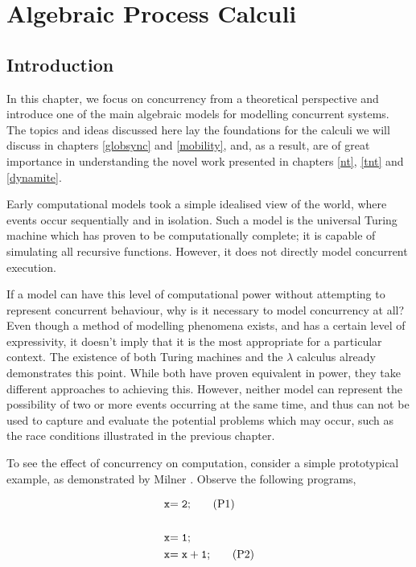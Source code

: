
\chapter{Algebraic Process Calculi}
\label{apc}

\section{Introduction}

In this chapter, we focus on concurrency from a theoretical
perspective and introduce one of the main algebraic models for
modelling concurrent systems.  The topics and ideas discussed here lay
the foundations for the calculi we will discuss in chapters
\ref{globsync} and \ref{mobility}, and, as a result, are of great
importance in understanding the novel work presented in chapters
\ref{nt}, \ref{tnt} and \ref{dynamite}.

Early computational models took a simple idealised view of the world,
where events occur sequentially and in isolation.  Such a model is the
universal Turing machine \cite{turing:36} which has proven to be
computationally complete; it is capable of simulating all recursive
functions.  However, it does not directly model concurrent execution.

If a model can have this level of computational power without
attempting to represent concurrent behaviour, why is it necessary to
model concurrency at all?  Even though a method of modelling phenomena
exists, and has a certain level of expressivity, it doesn't imply that
it is the most appropriate for a particular context.  The existence of
both Turing machines and the $\lambda$ calculus already demonstrates
this point.  While both have proven equivalent in power, they take
different approaches to achieving this.  However, neither model can
represent the possibility of two or more events occurring at the same
time, and thus can not be used to capture and evaluate the potential
problems which may occur, such as the race conditions illustrated in
the previous chapter.

To see the effect of concurrency on computation, consider a simple
prototypical example, as demonstrated by Milner \cite{milner:lecture}.
Observe the following programs,

\begin{align*}
\mathtt{x} & \mathtt{= 2;}\tag{P1} \\
\\
\mathtt{x} & \mathtt{= 1;}\notag \\
\mathtt{x} & \mathtt{= x + 1;}\tag{P2}
\end{align*}

